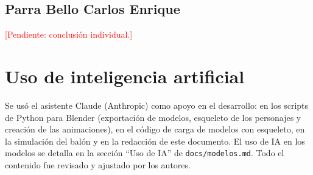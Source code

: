 \documentclass[12pt,letterpaper]{article}
\newcommand{\pendiente}[1]{\textcolor{red}{[Pendiente: #1]}}
\begin{document}
\subsection*{Parra Bello Carlos Enrique}
\pendiente{conclusión individual.}

\section*{Uso de inteligencia artificial}
Se usó el asistente Claude (Anthropic) como apoyo en el desarrollo: en los scripts de Python
para Blender (exportación de modelos, esqueleto de los personajes y creación de las
animaciones), en el código de carga de modelos con esqueleto, en la simulación del balón y en
la redacción de este documento. El uso de IA en los modelos se detalla en la sección
``Uso de IA'' de \texttt{docs/modelos.md}. Todo el contenido fue revisado y ajustado por los
autores.
\end{document}
